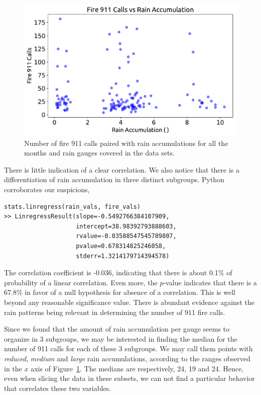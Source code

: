 \documentclass[12pt,a4paper]{article}
\begin{document}
\begin{figure}[ht!]
\centering
\includegraphics[scale=0.65]{figs/NoCor.pdf}
\caption{Number of fire 911 calls paired with rain accumulations for all the months and rain gauges covered in the data sets.}
\label{NoCor}
\end{figure}

There is little indication of a clear correlation. We also notice that there is a differentiation of rain accumulation in three distinct subgroups. Python corroborates our suspicions,

\begin{verbatim}
stats.linregress(rain_vals, fire_vals)
>> LinregressResult(slope=-0.5492766384107909,
                    intercept=38.98392793888603,
                    rvalue=-0.03588547545789807,
                    pvalue=0.678314825246058,
                    stderr=1.3214179714394578)
\end{verbatim}


The correlation coefficient is -0.036, indicating that there is about 0.1\% of probability of a linear correlation. Even more, the $p$-value indicates that there is a 67.8\% in favor of a null hypothesis for absence of a correlation. This is well beyond any reasonable significance value. There is abundant evidence against the rain patterns being relevant in determining the number of 911 fire calls.

Since we found that the amount of rain accumulation per gauge seems to organize in 3 subgroups, we may be interested in finding the median for the number of 911 calls for each of these 3 subgroups. We may call them points with \emph{reduced}, \emph{medium} and \emph{large} rain accumulations, according to the ranges observed in the $x$ axis of Figure~\ref{NoCor}. The medians are respectively, 24, 19 and 24. Hence, even when slicing the data in these subsets, we can not find a particular behavior that correlates these two variables.
\end{document}
